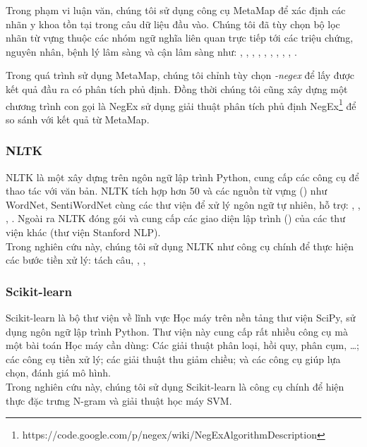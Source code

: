 Trong phạm vi luận văn, chúng tôi sử dụng công cụ MetaMap để xác định các nhãn y khoa tồn tại trong câu dữ liệu đầu vào. Chúng tôi đã tùy chọn bộ lọc nhãn từ vựng thuộc các nhóm ngữ nghĩa liên quan trực tiếp tới các triệu chứng, nguyên nhân, bệnh lý lâm sàng và cận lâm sàng như: , , , , , , , , , .

Trong quá trình sử dụng MetaMap, chúng tôi chỉnh tùy chọn \textit{-negex} để lấy được kết quả đầu ra có phân tích phủ định. Đồng thời chúng tôi cũng xây dựng một chương trình con gọi là NegEx sử dụng giải thuật phân tích phủ định NegEx\footnote{https://code.google.com/p/negex/wiki/NegExAlgorithmDescription} để so sánh với kết quả từ MetaMap.

\subsubsection*{NLTK}
NLTK \cite{bird2009natural} là một  xây dựng trên ngôn ngữ lập trình Python, cung cấp các công cụ để thao tác với văn bản. NLTK tích hợp hơn 50  và các nguồn từ vựng () như WordNet, SentiWordNet cùng các thư viện để xử lý ngôn ngữ tự nhiên, hỗ trợ: , , , . Ngoài ra NLTK đóng gói và cung cấp các giao diện lập trình () của các thư viện khác (thư viện Stanford NLP).\\

Trong nghiên cứu này, chúng tôi sử dụng NLTK như công cụ chính để thực hiện các bước tiền xử lý: tách câu, , , 
\subsubsection*{Scikit-learn}
Scikit-learn \cite{scikit-learn} là bộ thư viện về lĩnh vực Học máy trên nền tảng thư viện SciPy, sử dụng ngôn ngữ lập trình Python. Thư viện này cung cấp rất nhiều công cụ mà một bài toán Học máy cần dùng: Các giải thuật phân loại, hồi quy, phân cụm, \ldots; các công cụ tiền xử lý; các giải thuật thu giảm chiều; và các công cụ giúp lựa chọn, đánh giá mô hình.\\

Trong nghiên cứu này, chúng tôi sử dụng Scikit-learn là công cụ chính để hiện thực đặc trưng N-gram và giải thuật học máy SVM.

